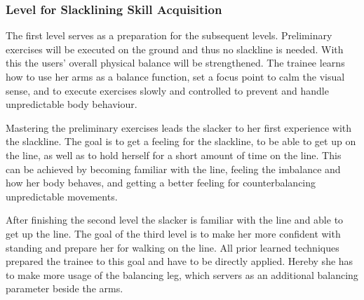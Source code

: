 \subsubsection{Level for Slacklining Skill Acquisition}
The first level serves as a preparation for the subsequent levels.
Preliminary exercises will be executed on the ground and thus no slackline is needed.
With this the users' overall physical balance will be strengthened.
The trainee learns how to use her arms as a balance function, set a focus point to calm the visual sense, and to execute exercises slowly and controlled to prevent and handle unpredictable body behaviour.

Mastering the preliminary exercises leads the slacker to her first experience with the slackline.
The goal is to get a feeling for the slackline, to be able to get up on the line, as well as to hold herself for a short amount of time on the line.
This can be achieved by becoming familiar with the line, feeling the imbalance and how her body behaves, and getting a better feeling for counterbalancing unpredictable movements.

After finishing the second level the slacker is familiar with the line and able to get up the line.
The goal of the third level is to make her more confident with standing and prepare her for walking on the line.
All prior learned techniques prepared the trainee to this goal and have to be directly applied.
Hereby she has to make more usage of the balancing leg, which servers as an additional balancing parameter beside the arms.

